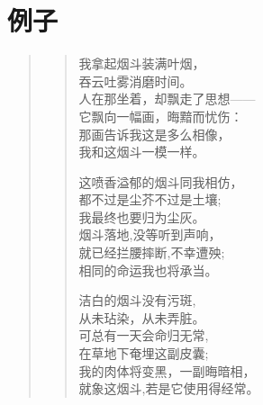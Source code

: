 \documentclass[openany,oneside]{book}
\begin{document}
\chapter{例子}

\begin{quote}
    \begin{verse}
        我拿起烟斗装满叶烟，\\
        \hspace{1em}吞云吐雾消磨时间。\\
        人在那坐着，却飘走了思想------\\
        \hspace{1em}它飘向一幅画，晦黯而忧伤：\\
        \hspace{2em}那画告诉我这是多么相像，\\
        \hspace{2em}我和这烟斗一模一样。\\
        \vspace{1em}
        
        这喷香溢郁的烟斗同我相仿，\\
        \hspace{1em}都不过是尘芥不过是土壤;\\
        我最终也要归为尘灰。\\
        \hspace{1em}烟斗落地,没等听到声响，\\
        \hspace{2em}就已经拦腰摔断,不幸遭殃;\\
        \hspace{2em}相同的命运我也将承当。\par
        \vspace{1em}
        
        洁白的烟斗没有污斑,\\
        \hspace{1em}从未玷染，从未弄脏。\\
        \hspace{2em}可总有一天会命归无常, \\
        \hspace{1em}在草地下奄埋这副皮囊;\\
        \hspace{2em}我的肉体将变黑，一副晦暗相，\\
        \hspace{2em}就象这烟斗,若是它使用得经常。\\
        \vspace{1em}
        

\end{verse}
\end{quote}
\end{document}
